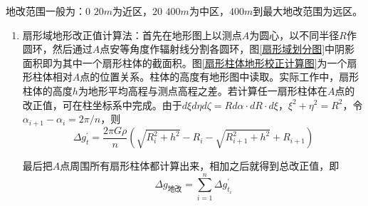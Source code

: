 地改范围一般为：$\text{0~}20m$为近区，$\text{20~}400m$为中区，$400m$到最大地改范围为远区。

\begin{enumerate}
	\item 扇形域地形改正值计算法：首先在地形图上以测点$A$为圆心，以不同半径$R$作圆环，然后通过$A$点安等角度作辐射线分割各圆环，图\ref{扇形域划分图}中阴影面积即为其中一个扇形柱体的截面积。图\ref{扇形柱体地形校正计算图}为一个扇形柱体相对$A$点的位置关系。柱体的高度有地形图中读取。实际工作中，扇形柱体的高度$h$为地形平均高程与测点高程之差。若计算任一扇形柱体在$A$点的改正值，可在柱坐标系中完成。由于$d\xi d\eta d\zeta = Rd\alpha \cdot dR\cdot d\xi $，$\xi ^2+\eta ^2=R^2$，令$\alpha _{i+1}-\alpha _i=2\pi /n$，则
	\begin{equation}
		\varDelta g_{t}^{}=\frac{2\pi G\rho}{n}\left( \sqrt{R_{i}^{2}+h^2}-R_i-\sqrt{R_{i+1}^{2}+h^2}+R_{i+1} \right) 
	\end{equation}
	
	最后把$A$点周围所有扇形柱体都计算出来，相加之后就得到总改正值，即
	\begin{equation}
		\varDelta g_{\text{地改}}=\sum_{i=1}^n{\varDelta g_{t_i}^{}}
	\end{equation}
	

\end{enumerate}
